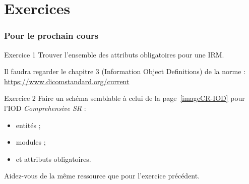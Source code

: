 \section{Exercices}

	\frame
	{
		\frametitle{Pour le prochain cours}
		
		{
			\begin{block}{Exercice 1}
				Trouver l'ensemble des attributs obligatoires pour une IRM.

				Il faudra regarder le chapitre 3 (Information Object Definitions) de la norme : \url{https://www.dicomstandard.org/current}
			\end{block}
		}

		{
			\begin{block}{Exercice 2}
				Faire un sch\'ema semblable \`a  celui de la page~\ref{imageCR-IOD} pour l'IOD \emph{Comprehensive SR} :
				\begin{itemize}
					\item entit\'es ;
					\item modules ;
					\item et attributs obligatoires.
				\end{itemize}

				Aidez-vous de la m\^eme ressource que pour l'exercice pr\'ec\'edent.
			\end{block}
		}
	}
